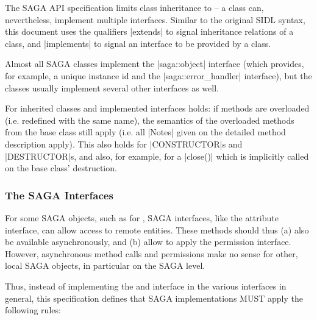   The SAGA API specification limits class inheritance to
   -- a class can, nevertheless, implement
  multiple interfaces.  Similar to the original SIDL syntax,
  this document uses the qualifiers |extends| to signal
  inheritance relations of a class, and |implements| to signal
  an interface to be provided by a class.

  Almost all SAGA classes implement the |saga::object| interface
  (which provides, for example, a unique instance id and the
  |saga::error_handler| interface), but the classes usually
  implement several other interfaces as well.

  For inherited classes and implemented interfaces
  holds: if methods are overloaded (i.e. redefined with the same
  name), the semantics of the overloaded methods from the base class
  still apply
  (i.e.  all |Notes| given on the detailed method description
  apply).  This  also holds
  for |CONSTRUCTOR|s and
  |DESTRUCTOR|s, and also, for example, for a |close()| which
  is implicitly called on the base class' destruction.

  \subsubsection{The SAGA Interfaces}

   For some SAGA objects, such as for
   , SAGA interfaces, like the attribute
   interface, can allow access to remote entities.   These
   methods should thus (a) also be available asynchronously, and
   (b) allow to apply the permission interface.  However,
   asynchronous method calls and permissions make no sense
   for other, local SAGA objects, in particular on the SAGA
   \LF level.

   Thus, instead of implementing the  and
    interface in the various interfaces in
   general, this specification defines that SAGA implementations
   MUST apply the following rules:

